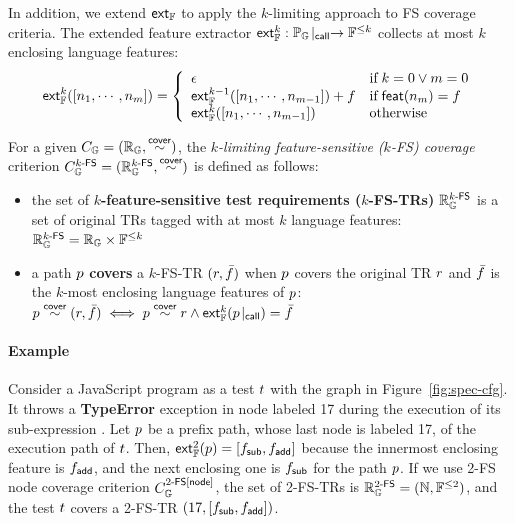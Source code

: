 In addition, we extend $\textsf{ext}_{\mathbb{F}}$ to apply the $k$-limiting approach to FS coverage
criteria. The extended feature extractor $\textsf{ext}_{\mathbb{F}}^{k}: {\mathbb{P}_{\mathbb{G}}}\!\mid_{\textsf{call}}
\rightarrow \mathbb{F}^{\leq k}$ collects at most $k$ enclosing language features:
%
\begin{equation}\label{equ:extfeats}
  \textsf{ext}_{\mathbb{F}}^{k}([n_1, \cdots, n_m]) = \left\{
    \begin{array}{ll}
      \epsilon & \text{if} \; k = 0 \vee m = 0\\

      \textsf{ext}_{\mathbb{F}}^{k-1}([n_1, \cdots, n_{m-1}]) + f & \text{if} \;
      \textsf{feat}(n_m) = f\\

      \textsf{ext}_{\mathbb{F}}^{k}([n_1, \cdots, n_{m-1}]) & \text{otherwise}\\
    \end{array}
  \right.
\end{equation}


\begin{definition}\label{def:k-fs-cov}
  For a given $C_{\mathbb{G}} = (\mathbb{R}_{\mathbb{G}}, \overset{\textsf{cover}}{\sim})$, the
  \textit{$k$-limiting feature-sensitive ($k$-FS) coverage} criterion
  $C_{\mathbb{G}}^{{k}\textsf{-FS}} = (\mathbb{R}_{\mathbb{G}}^{{k}\textsf{-FS}}, \overset{\textsf{cover}}{\sim})$ is defined as follows:
  \begin{itemize}
    \item the set of \textbf{$k$-feature-sensitive test requirements
      ($k$-FS-TRs)} $\mathbb{R}_{\mathbb{G}}^{{k}\textsf{-FS}}$ is a set of original TRs tagged with
      at most $k$ language features:
$
        \mathbb{R}_{\mathbb{G}}^{{k}\textsf{-FS}} = \mathbb{R}_{\mathbb{G}} \times \mathbb{F}^{\leq k}
$
    \item a path $p$ \textbf{covers} a $k$-FS-TR $(r, \bar{f})$ when $p$
      covers the original TR $r$ and $\bar{f}$ is the $k$-most enclosing
      language features of $p$:
$
        p \overset{\textsf{cover}}{\sim} (r, \bar{f}) \iff p \overset{\textsf{cover}}{\sim} r \wedge
        \textsf{ext}_{\mathbb{F}}^{k}({p}\!\mid_{\textsf{call}}) = \bar{f}
$
  \end{itemize}
\end{definition}


\paragraph{\textbf{Example}}
%
Consider a JavaScript program  as a test $t$ with the
graph in Figure~\ref{fig:spec-cfg}.
%
It throws a \textbf{TypeError} exception in node labeled 17 during the execution
of its sub-expression .
%
Let $p$ be a prefix path, whose last node is labeled 17, of the execution path
of $t$.
%
Then, $\textsf{ext}_{\mathbb{F}}^{2}(p) = [f_{\textsf{sub}}, f_{\textsf{add}}]$ because the innermost enclosing
feature is $f_{\textsf{add}}$, and the next enclosing one is $f_{\textsf{sub}}$ for the
path $p$.
%
If we use 2-FS node coverage criterion $C_{\mathbb{G}}^{{2}\textsf{-FS}[\textsf{node}]}$, the set of
2-FS-TRs is $\mathbb{R}_{\mathbb{G}}^{{2}\textsf{-FS}} = (\mathbb{N}, \mathbb{F}^{\leq 2})$, and the test
$t$ covers a 2-FS-TR $(17, [f_{\textsf{sub}}, f_{\textsf{add}}])$.

